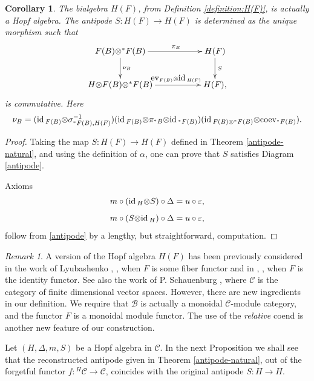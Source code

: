 \documentclass[11pt]{amsart}
\newcommand{\coev}{\mbox{coev}}
\newcommand{\ev}{\mbox{ev}}
\newcommand{\uc}{f}
\newcommand{\ot}{{\otimes}}
\newcommand{\vc}{{\mathcal C}}
\newcommand{\Bc}{{\mathcal B}}
\newcommand{\id}{\mbox{\rm id\,}}
\renewcommand{\_}[1]{\mbox{$_{\left( #1 \right)}$}}
\theoremstyle{plain}
\numberwithin{equation}{section}
\newtheorem{cor}[teo]{Corollary}
\theoremstyle{definition}
\theoremstyle{remark}
\newtheorem{rmk}[teo]{Remark}
\def\pf{\begin{proof}}
\def\epf{\end{proof}}
\theoremstyle{introTheorems}
\begin{document}
\begin{cor}\label{antipode-reconstruct} The bialgebra $H(F)$, from Definition \ref{definition:H(F)}, is actually a Hopf algebra. The antipode $S:H(F)\to H(F)$ is determined as  the unique morphism such that
\begin{equation}\label{antipode}
\xymatrix{
 F(B)\ot {}^*F(B) \ar[d]^{\nu_B}\ar[rr]^{\qquad\pi_B}&& H(F)
 \ar[d]^{S} \\
 H\ot F(B)\ot {}^*F( B) \ar[rr]^{\qquad \ev_{F(B)} \ot\id_{H(F)} }&& H(F),}
\end{equation}
is commutative. Here 
$$\nu_B= (\id_{F(B)}\ot  \sigma^{-1}_{{}^*F(B),H(F)})(\id_{F(B)}\ot \pi_{{}^*B}\ot\id_{{}^*F(B)})(\id_{F(B)\ot {}^*F(B)}\ot \coev_{{}^*F(B)}).$$
\end{cor}
\pf Taking the map $S:H(F)\to H(F)$ defined in Theorem \ref{antipode-natural}, and using the definition of $\alpha$, one can prove that $S$ satisfies Diagram \eqref{antipode}. 

Axioms $$m\circ (\id_H\ot S)\circ \Delta=u\circ \varepsilon,$$
 $$m\circ ( S\ot\id_H)\circ \Delta=u\circ \varepsilon,$$
 follow from \eqref{antipode} by a lengthy, but straightforward, computation.
\epf






\begin{rmk} A version of the Hopf algebra $H(F)$ has been previously considered in the work of Lyubashenko \cite{Li1},  \cite{Li2}, when $F$ is some fiber functor and in \cite{Li3},  \cite{Li4}, when $F$ is the identity functor. See also the work of  P. Schauenburg \cite{PS}, where $\vc$ is the category of finite dimensional vector spaces. However, there are new ingredients in our definition.  We require that $\Bc$ is actually a monoidal $\vc$-module category, and the functor $F$ is a monoidal  module functor.  The use of the \textit{relative} coend is another new feature of our construction.
\end{rmk}





Let $(H,\Delta, m, S)$ be a  Hopf algebra in $\vc$. In the next Proposition we shall see that the reconstructed antipode given in Theorem \ref{antipode-natural}, out of the forgetful functor $\uc:{}^H\vc\to\vc$, coincides with the original  antipode $S:H\to H$.
\end{document}
